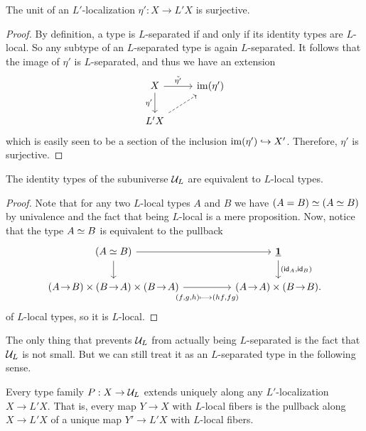 \begin{lem}\label{lemma:etasurjective}
    The unit of an $L'$-localization $\eta' : X \to L'X$ is surjective.
\end{lem}
\begin{proof}
By definition, a type is $L$-separated if and only if its identity types are $L$-local.
So any subtype of an $L$-separated type is again $L$-separated.
It follows that the image of $\eta'$ is $L$-separated, and thus we have an extension
\[
  \begin{tikzcd}
    X \arrow[r,"\tilde{\eta'}"] \arrow[d,swap,"\eta'"] & \im(\eta') \\
    L'X \arrow[ur,dashed]
  \end{tikzcd}
\]
which is easily seen to be a section of the inclusion $\operatorname{im}(\eta')\hookrightarrow X'$.
Therefore, $\eta'$ is surjective.
\end{proof}

\begin{prop}\label{prop:UU_L-is-L-separated}
The identity types of the subuniverse $\mathcal{U}_L$ are equivalent to $L$-local types.
\end{prop}


\begin{proof}
    Note that for any two $L$-local types $A$ and $B$ we have $\eqv{(A=B)}{(\eqv{A}{B})}$ by univalence and the
    fact that being $L$-local is a mere proposition.
    Now, notice that the type $\eqv{A}{B}$ is equivalent to the pullback
  \[
    \begin{tikzcd}[column sep=huge]
      (\eqv{A}{B}) \arrow[r] \arrow[d] & \unit \arrow[d,"{(\idfunc[A],\idfunc[B])}"] \\
      (A \sto B) \times (B \sto A) \times (B \sto A)
         \arrow[r,swap,"{(f,g,h) \longmapsto (hf,fg)}" yshift=-1ex] & (A \sto A) \times (B \sto B).
    \end{tikzcd}
  \]
  of $L$-local types, so it is $L$-local.
\end{proof}

The only thing that prevents $\mathcal{U}_L$ from actually being $L$-separated is the fact that
$\mathcal{U}_L$ is not small.
But we can still treat it as an $L$-separated type in the following sense.

\begin{lem}\label{lemma:extendtoUL}
Every type family $P : X \to \mathcal{U}_L$ extends uniquely along any $L'$-localization $X \to L'X$.
That is, every map $Y \to X$ with $L$-local fibers is the pullback along $X \to L'X$ of
a unique map $Y' \to L'X$ with $L$-local fibers.
\end{lem}

